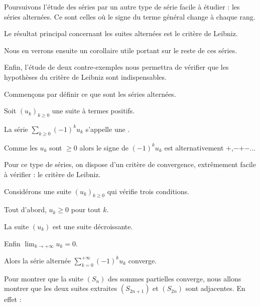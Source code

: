 






\debuttexte


\diapo

Poursuivons l'étude des séries par un autre type de série facile à étudier : les séries alternées.
Ce sont celles où le signe du terme général change à chaque rang.

\change
\change
Le résultat principal concernant les suites alternées est le critère de Leibniz.

\change
Nous en verrons ensuite un corollaire utile portant sur le reste de ces séries.

\change
Enfin, l'étude de deux contre-exemples nous permettra de vérifier que les hypothèses du critère de Leibniz sont indispensables.

\diapo

Commençons par définir ce que sont les séries alternées.

Soit $(u_k)_{k\ge0}$ une suite à termes positifs.

\change
La série $\sum_{k \ge 0} (-1)^k u_k$ s'appelle une .

Comme les $u_k$ sont $\ge0$ alors le signe de $(-1)^k u_k$ est alternativement $+$,$-$$+$$-$...


\change
Pour ce type de séries, on dispose d'un critère de convergence, extrêmement facile à vérifier : le critère de Leibniz.

\change
Considérons une suite $(u_k)_{k\ge0}$ qui vérifie trois conditions.

\change
Tout d'abord, $u_k  \ge 0$ pour tout $k$.

\change
La suite $(u_k)$ est une suite décroissante.

\change
Enfin $\lim_{k\to+\infty} u_k=0$.

\change
Alors la série alternée $\displaystyle \sum_{k=0}^{+\infty} (-1)^k u_k$ converge.

\diapo

Pour montrer que la suite $(S_n)$ des sommes partielles converge, nous allons montrer que les deux suites extraites $(S_{2n+1})$ et $(S_{2n})$ sont adjacentes. En effet :

